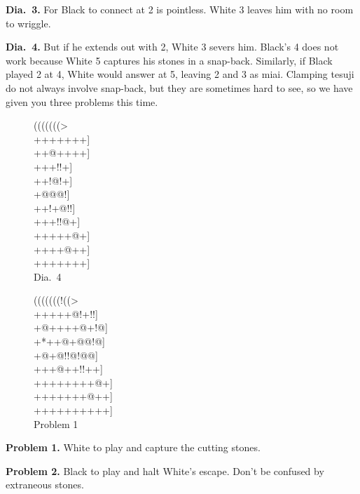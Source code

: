 \documentclass[mcrownvopaper,10pt,oneside,onecolumn,draft,showtrims]{memoir}
\begin{document}
\noindent
\textbf{Dia.\ 3.} For Black to connect at 2 is pointless. White 3 leaves him with
no room to wriggle.

\noindent
\textbf{Dia.\ 4.} But if he extends out with 2, White 3 severs him. Black's 4 does
not work because White 5 captures his stones in a snap-back. Similarly,
if Black played 2 at 4, White would answer at 5, leaving 2 and 3 as miai.
Clamping tesuji do not always involve snap-back, but they are sometimes
hard to see, so we have given you three problems this time.

\begin{figure}[ht]
    \begin{minipage}[c]{0.50\linewidth}
        \centering    
        {\gnos%
        (((((((>\\
        +++++++]\\
        ++@++++]\\
        +++{\gnosw{}}!!+]\\
        ++!{\gnosb{}}@!+]\\
        +{\gnosb{}}@{\gnosw{}}@@!]\\
        ++!+@!!]\\
        +++!!@+]\\
        +++++@+]\\
        ++++@++]\\
        +++++++]\\
        }
        Dia.\ 4
    \end{minipage}%
    \begin{minipage}[c]{0.50\linewidth}
        \centering    
        {\gnos%
        (((((((!((>\\
        +++++@!+!!]\\
        +@++++@+!@]\\
        +*++@+@@!@]\\
        +@+@!!@!@@]\\
        +++@++!!++]\\
        ++++++++@+]\\
        +++++++@++]\\
        ++++++++++]\\
        }
        Problem 1
    \end{minipage}%
\end{figure}

\noindent
\textbf{Problem 1.} White to play and capture the cutting stones.

\noindent
\textbf{Problem 2.} Black to play and halt White's escape. Don't be confused by
extraneous stones.
\end{document}
